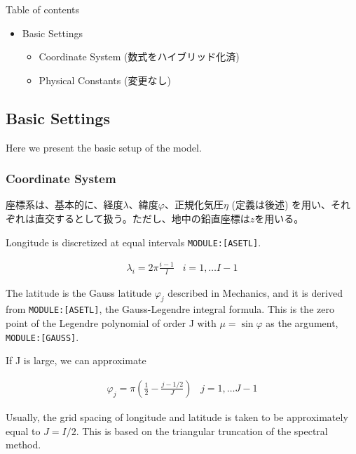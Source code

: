 Table of contents

\begin{itemize}
\tightlist
\item
  Basic Settings

  \begin{itemize}
  \tightlist
  \item
    Coordinate System (数式をハイブリッド化済)
  \item
    Physical Constants (変更なし)
  \end{itemize}
\end{itemize}

\hypertarget{basic-settings}{%
\subsection{Basic Settings}\label{basic-settings}}

Here we present the basic setup of the model.

\hypertarget{coordinate-system}{%
\subsubsection{Coordinate System}\label{coordinate-system}}

座標系は、基本的に、経度\(\lambda\)、緯度\(\varphi\)、正規化気圧\(\eta\)
(定義は後述)
を用い、それぞれは直交するとして扱う。ただし、地中の鉛直座標は\(z\)を用いる。

Longitude is discretized at equal intervals \texttt{MODULE:{[}ASETL{]}}.

\begin{eqnarray}
  \lambda_i = 2 \pi \frac{i-1}{I}  \;\;\; i = 1, \ldots I-1
\end{eqnarray}

The latitude is the Gauss latitude \(\varphi_j\) described in Mechanics,
and it is derived from \texttt{MODULE:{[}ASETL{]}}, the Gauss-Legendre
integral formula. This is the zero point of the Legendre polynomial of
order J with \(\mu = \sin \varphi\) as the argument,
\texttt{MODULE:{[}GAUSS{]}}.

If J is large, we can approximate

\begin{eqnarray}
  \varphi_j =  \pi ( \frac{1}{2}- \frac{j-1/2}{J} ) \;\;\; j = 1, \ldots J-1
\end{eqnarray}

Usually, the grid spacing of longitude and latitude is taken to be
approximately equal to \(J = I/2\). This is based on the triangular
truncation of the spectral method.

